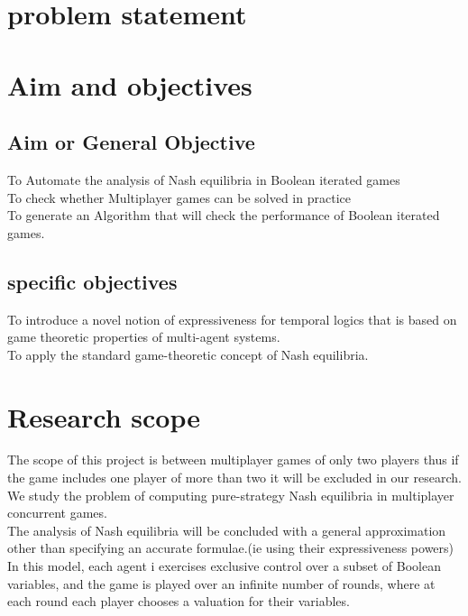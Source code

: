 \documentclass[14pt, a4paper]{article}
\begin{document}
				
			\section{problem statement}
			
			
			\section{Aim and objectives}
			
				\subsection{Aim or General Objective}
					To Automate the analysis of Nash equilibria in Boolean iterated games\\
		To check whether Multiplayer games can be solved in practice\\
		To generate an Algorithm that will check the performance of Boolean iterated games.\\
		
				
				\subsection{specific objectives}
						To introduce a novel notion of expressiveness for temporal logics that is based on game theoretic properties of multi-agent systems.\\
		To apply the standard game-theoretic concept of Nash equilibria.\\

			
			\section{Research scope}
			
				The scope of this project is between multiplayer games of only two players thus if the game includes one player of more than two it will be excluded in our research.\\
	We study the problem of computing pure-strategy Nash equilibria in multiplayer concurrent games.\\
	The analysis of Nash equilibria will be concluded with a general approximation other than specifying an accurate formulae.(ie using their expressiveness powers)\\

	In this model, each agent i exercises exclusive control over a subset of Boolean variables, and the game is played over an infinite number of rounds, where at each round each player chooses a valuation for their variables.\\
\end{document}
